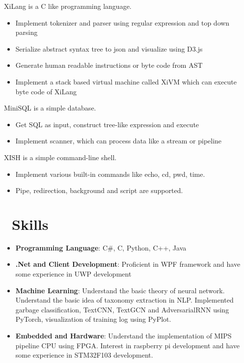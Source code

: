 \documentclass{resume}
\begin{document}
XiLang is a C like programming language.
\begin{itemize}
  \item Implement tokenizer and parser using regular expression and top down parsing
  \item Serialize abstract syntax tree to json and visualize using D3.js
  \item Generate human readable instructions or byte code from AST
  \item Implement a stack based virtual machine called XiVM which can execute byte code of XiLang
\end{itemize}

MiniSQL is a simple database.
\begin{itemize}
  \item Get SQL as input, construct tree-like expression and execute
  \item Implement scanner, which can process data like a stream or pipeline
\end{itemize}

XISH is a simple command-line shell.
\begin{itemize}
  \item Implement various built-in commands like echo, cd, pwd, time.
  \item Pipe, redirection, background and script are supported.
\end{itemize}

\section{\faCogs\ Skills}
\begin{itemize}[parsep=0.25ex]
    \item \textbf{Programming Language}:
        C\#, C, Python, C++, Java

    \item \textbf{.Net and Client Development}:
        Proficient in WPF framework and have some experience in UWP development

    \item \textbf{Machine Learning}:
        Understand the basic theory of neural network. Understand the basic idea of taxonomy extraction in NLP.
        Implemented garbage classification, TextCNN, TextGCN and AdversarialRNN using PyTorch,
        visualization of training log using PyPlot.
    
    \item \textbf{Embedded and Hardware}:
        Understand the implementation of MIPS pipeline CPU using FPGA.
        Interest in raspberry pi development and have some experience in STM32F103 development.
\end{itemize}
\end{document}
